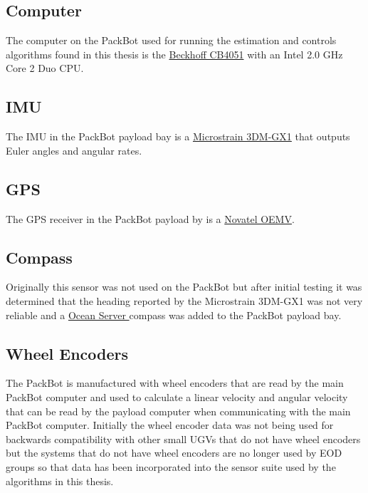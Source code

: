 \subsection{Computer}
\label{sec:bgComputer}
The computer on the PackBot used for running the estimation and controls algorithms found in this thesis is the \href{http://www.beckhoff.com/english.asp?motherboards/cb4051.htm}{Beckhoff CB4051} with an Intel 2.0 GHz Core 2 Duo CPU.

\subsection{IMU}
\label{sec:bgIMU}
The IMU in the PackBot payload bay is a \href{http://www.microstrain.com/3dm-gx1.aspx}{Microstrain 3DM-GX1} that outputs Euler angles and angular rates.

\subsection{GPS}
\label{sec:bgGPS}
The GPS receiver in the PackBot payload by is a \href{http://www.novatel.com/products/gnss-receivers/oem-receiver-boards/oemv-receivers/}{Novatel OEMV}.

\subsection{Compass}
\label{sec:bgCompass}
Originally this sensor was not used on the PackBot but after initial testing it was determined that the heading reported by the Microstrain 3DM-GX1 was not very reliable and a \href{http://www.oceanserver-store.com/os3axdico3.html}{Ocean Server } compass was added to the PackBot payload bay.

\subsection{Wheel Encoders}
\label{sec:bgEncoders}
The PackBot is manufactured with wheel encoders that are read by the main PackBot computer and used to calculate a linear velocity and angular velocity that can be read by the payload computer when communicating with the main PackBot computer. Initially the wheel encoder data was not being used for backwards compatibility with other small UGVs that do not have wheel encoders but the systems that do not have wheel encoders are no longer used by EOD groups so that data has been incorporated into the sensor suite used by the algorithms in this thesis.
